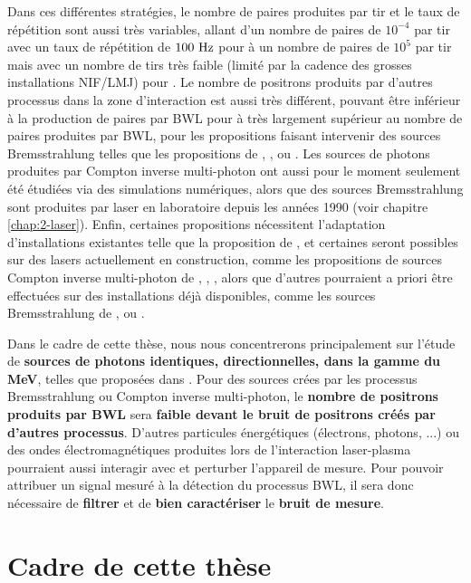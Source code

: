 \begin{refsection}
Dans ces différentes stratégies, le nombre de paires produites par tir et le taux de répétition sont aussi très variables, allant d'un nombre de paires de $10^{-4}$ par tir avec un taux de répétition de $100 ~ \rm Hz$ pour \cite{drebot_2017} à un nombre de paires de $10^5$ par tir mais avec un nombre de tirs très faible (limité par la cadence des grosses installations NIF/LMJ) pour \cite{pike_2014}. Le nombre de positrons produits par d'autres processus dans la zone d'interaction est aussi très différent, pouvant être inférieur à la production de paires par BWL pour \cite{drebot_2017} à très largement supérieur au nombre de paires produites par BWL, pour les propositions faisant intervenir des sources Bremsstrahlung telles que les propositions de \cite{pike_2014}, \cite{ribeyre_2016}, ou \cite{golub_2020}. Les sources de photons produites par Compton inverse multi-photon ont aussi pour le moment seulement été étudiées via des simulations numériques, alors que des sources Bremsstrahlung sont produites par laser en laboratoire depuis les années 1990 (voir chapitre \ref{chap:2-laser}). Enfin, certaines propositions nécessitent l'adaptation d'installations existantes telle que la proposition de \cite{drebot_2017}, et certaines seront possibles sur des lasers actuellement en construction, comme les propositions de sources Compton inverse multi-photon de \cite{ribeyre_2016}, \cite{yu_2019}, \cite{wang_2020}, \cite{he_2020} alors que d'autres pourraient a priori être effectuées sur des installations déjà disponibles, comme les sources Bremsstrahlung de \cite{pike_2014}, \cite{ribeyre_2016} ou \cite{golub_2020}. 

Dans le cadre de cette thèse, nous nous concentrerons principalement sur l'étude de \textbf{sources de photons identiques, directionnelles, dans la gamme du MeV}, telles que proposées dans \cite{ribeyre_2016}. Pour des sources crées par les processus Bremsstrahlung ou Compton inverse multi-photon, le \textbf{nombre de positrons produits par BWL} sera \textbf{faible devant le bruit de positrons créés par d'autres processus}. 
D'autres particules énergétiques (électrons, photons, ...) ou des ondes électromagnétiques produites lors de l'interaction laser-plasma pourraient aussi interagir avec et perturber l'appareil de mesure. Pour pouvoir attribuer un signal mesuré à la détection du processus BWL, il sera donc nécessaire de \textbf{filtrer} et de \textbf{bien caractériser} le \textbf{bruit de mesure}.

\section{Cadre de cette thèse}


\end{refsection}
